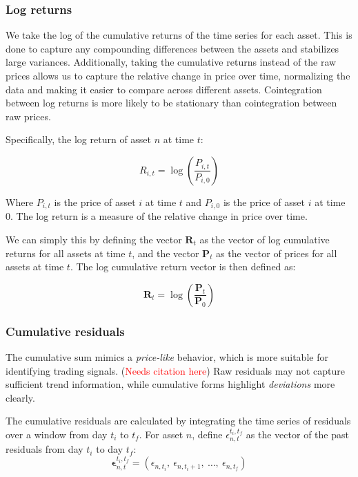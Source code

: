 \documentclass[12pt]{article}
\begin{document}
\subsubsection{Log returns}

We take the log of the cumulative returns of the time series for each asset. This is done to capture any compounding differences between the assets and stabilizes large variances. Additionally, taking the cumulative returns instead of the raw prices allows us to capture the relative change in price over time, normalizing the data and making it easier to compare across different assets. Cointegration between log returns is more likely to be stationary than cointegration between raw prices.

\vspace{10pt}
\noindent
Specifically, the log return of asset $n$ at time $t$:

\begin{equation}
    R_{i,t} = \log\left( \frac{P_{i,t}}{P_{i,0}} \right)
    \label{eq:log_cumulative_return}
\end{equation}

\noindent
Where $P_{i,t}$ is the price of asset $i$ at time $t$ and $P_{i,0}$ is the price of asset $i$ at time $0$. The log return is a measure of the relative change in price over time.

\noindent
We can simply this by defining the vector $\mathbf{R}_t$ as the vector of log cumulative returns for all assets at time $t$, and the vector $\mathbf{P}_t$ as the vector of prices for all assets at time $t$. The log cumulative return vector is then defined as:

\begin{equation}
    \mathbf{R}_t = \log\left( \frac{\mathbf{P}_t}{\mathbf{P}_0} \right)
    \label{eq:log_cumulative_return_vector}
\end{equation}

\subsubsection{Cumulative residuals}

The cumulative sum mimics a \textit{price-like} behavior, which is more suitable for identifying trading signals. (\textcolor{red}{Needs citation here}) Raw residuals may not capture sufficient trend information, while cumulative forms highlight \textit{deviations} more clearly.

\vspace{10pt}
\noindent
The cumulative residuals are calculated by integrating the time series of residuals over a window from day $t_{i}$ to $t_{f}$. For asset $n$, define $\epsilon^{t_i,t_f}_{n,t}$ as the vector of the past residuals from day $t_{i}$ to day $t_{f}$:
\begin{equation}
    \mathbf{\epsilon}^{t_i,t_f}_{n,t} = \left( \epsilon_{n,t_i},\ \epsilon_{n,t_i+1},\ \ldots,\ \epsilon_{n,t_f} \right)
    \label{eq:residual_vector}
\end{equation}
\end{document}
